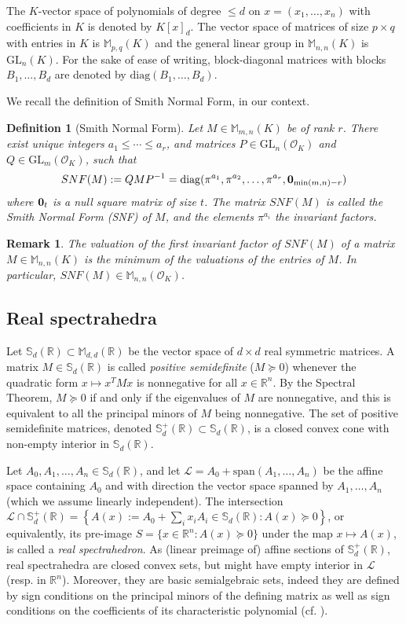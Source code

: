 \documentclass[a4paper,12pt]{article}
\newtheorem{definition}{Definition}
\newtheorem{remark}{Remark}
\newcommand{\R}{\mathbb{R}} %
\newcommand{\allmat}{\mathbb{M}} %
\newcommand{\sym}{\mathbb{S}} %
\renewcommand{\span}[1]{{\text{span}(#1)}} %
\newcommand{\calL}{\mathcal{L}} %
\newcommand{\OK}{\mathcal{O}_K}
\def\diag{\mathrm{diag}}
\newcommand{\GL}{\mathrm{GL}}
\begin{document}
The $K$-vector space of polynomials of degree $\leq d$ on $x=(x_1,\ldots,x_n)$
with coefficients in $K$ is denoted by $K[x]_{d}$. The vector space of matrices of
size $p \times q$ with entries in $K$ is $\allmat_{p,q}(K)$ and the general
linear group in $\allmat_{n,n}(K)$ is $\GL_n(K)$.
For the sake
of ease of writing, block-diagonal matrices with blocks $B_1,\ldots,B_d$ are denoted by
$\diag(B_1, \ldots, B_d)$.

We recall the definition of Smith Normal Form, in our context.
\begin{definition}[Smith Normal Form]\label{smith_nf}
  Let $M \in \allmat_{m,n}(K)$ be of rank $r$. There exist unique integers $a_1 \leq \cdots \leq a_r$, and
  matrices $P \in \GL_n(\OK)$ and $Q \in \GL_m(\OK)$, such that
  $$
  SNF(M) := QMP^{-1} = \diag(\pi^{a_1}, \pi^{a_2}, \ldots, \pi^{a_r}, {\bf 0}_{\min(m,n)-r})
  $$
  where ${\bf 0}_{t}$ is a null square matrix of size $t$.
  The matrix $SNF(M)$ is called the \emph{Smith Normal Form (SNF)} of $M$, and the elements $\pi^{a_i}$ the
  \emph{invariant factors}.
\end{definition}
\begin{remark}
  The valuation of the first invariant factor of $SNF(M)$ of a matrix
  $M \in \allmat_{n,n}(K)$ is the minimum of the valuations of the entries of
  $M$. In particular, $SNF(M) \in \allmat_{n,n}(\OK)$.
\end{remark}


\subsection{Real spectrahedra}

Let $\sym_d(\R) \subset \allmat_{d,d}(\R)$ be the vector space of $d \times d$ real symmetric
matrices. A matrix $M \in \sym_d(\R)$
is called \emph{positive semidefinite} ($M \succeq 0$) whenever the quadratic
form $x \mapsto x^TMx$ is nonnegative for all $x\in \R^n$. By the Spectral Theorem, $M \succeq 0$
if and only if the eigenvalues of $M$ are nonnegative, and this is equivalent to all the principal minors
of $M$ being nonnegative. The set of positive semidefinite matrices, denoted $\sym_d^+(\R) \subset \sym_d(\R)$,
is a closed convex cone with non-empty interior in $\sym_d(\R)$.

Let $A_0,A_1,\ldots,A_n \in \sym_d(\R)$, and let $\calL = A_0+\span{A_1,\ldots,A_n}$ be the affine space
containing $A_0$ and with direction the vector space spanned by $A_1,\ldots,A_n$ (which we assume linearly
independent). The intersection $\calL \cap \sym_d^+(\R) = \left\{A(x) := A_0+\sum_i x_i A_i \in \sym_d(\R) :
A(x) \succeq 0\right\}$, or
equivalently, its pre-image $S = \{x \in \R^n : A(x) \succeq 0\}$ under the map $x \mapsto A(x)$, is called
a \emph{real spectrahedron}. As (linear preimage of) affine sections of $\sym_d^+(\R)$, real spectrahedra
are closed convex sets, but might have empty interior in $\calL$ (resp. in $\R^n$).
Moreover, they are basic semialgebraic sets, indeed they are defined by sign conditions on the principal
minors of the defining matrix as well as sign conditions on the coefficients of its characteristic polynomial
(cf. ).
\end{document}
